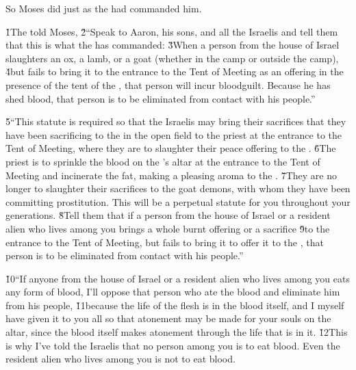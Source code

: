 So Moses did just as the  had commanded him.

\v{1}The  told Moses, \v{2}``Speak to Aaron, his sons, and all the Israelis and tell them that this is what the  has commanded: \v{3}When a person from the house of Israel slaughters an ox, a lamb, or a goat (whether in the camp or outside the camp), \v{4}but fails to bring it to the entrance to the Tent of Meeting as an offering in the presence of the tent of the , that person will incur bloodguilt. Because he has shed blood, that person is to be eliminated from contact with his people.''

\v{5}``This statute is required so that the Israelis may bring their sacrifices that they have been sacrificing to the  in the open field to the priest at the entrance to the Tent of Meeting, where they are to slaughter their peace offering to the . \v{6}The priest is to sprinkle the blood on the 's altar at the entrance to the Tent of Meeting and incinerate the fat, making a pleasing aroma to the . \v{7}They are no longer to slaughter their sacrifices to the goat demons, with whom they have been committing prostitution. This will be a perpetual statute for you throughout your generations. \v{8}Tell them that if a person from the house of Israel or a resident alien who lives among you brings a whole burnt offering or a sacrifice \v{9}to the entrance to the Tent of Meeting, but fails to bring it to offer it to the , that person is to be eliminated from contact with his people.''

\v{10}``If anyone from the house of Israel or a resident alien who lives among you eats any form of blood, I'll oppose that person who ate the blood and eliminate him from his people, \v{11}because the life of the flesh is in the blood itself, and I myself have given it to you all so that atonement may be made for your souls on the altar, since the blood itself makes atonement through the life that is in it. \v{12}This is why I've told the Israelis that no person among you is to eat blood. Even the resident alien who lives among you is not to eat blood.

